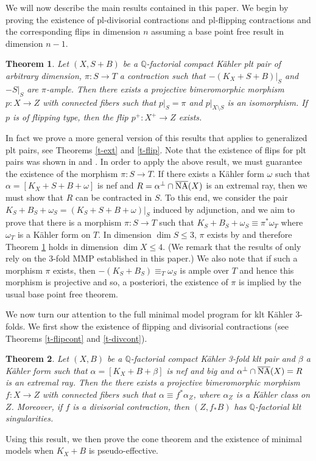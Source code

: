 \documentclass[12pt]{amsart}
\theoremstyle{plain}
\newtheorem{theorem}{Theorem}[section]
\theoremstyle{remark}
\theoremstyle{definition}
\newcommand{\<}{\leq}
\newcommand{\mbQ}{\mathbb{Q}}
\newcommand{\Q}{{\mathbb{Q}}}
\def\dim{\operatorname{dim}}
\theoremstyle{definition}
\theoremstyle{definition}
\numberwithin{equation}{section}
\theoremstyle{remark}
\begin{document}
We will now describe the main results contained in this paper. We begin by proving the existence of pl-divisorial contractions and pl-flipping contractions and the corresponding flips in dimension $n$ assuming a base point free result in dimension $n-1$.
\begin{theorem}\label{t-pl}
    Let $(X,S+B)$ be a $\Q$-factorial compact K\"ahler plt pair of arbitrary dimension, $\pi :S\to T$ a contraction such that $-(K_X+S+B)|_S$ and $-S|_S$ are $\pi$-ample. Then there exists a projective bimeromorphic morphism $p : X \to Z$ with connected fibers such that $p|_S = \pi$
and $p|_{X\setminus S}$ is an isomorphism. If $p$ is of flipping type, then the flip $p^+:X^+\to Z$ exists.
\end{theorem}
In fact we prove a more general version of this results that applies to generalized plt pairs, see Theorems \ref{t-ext} and \ref{t-flip}.
Note that the existence of flips for plt pairs was shown in \cite{Fuj22} and \cite{DHP22}.
In order to apply the above result, we must guarantee the existence of the morphism $\pi :S\to T$. If there exists a K\"ahler form $\omega$ such that $\alpha =[K_X+S+B+\omega]$ is nef and $R=\alpha ^\perp\cap \overline{\rm NA}(X)$ is an extremal ray, then we must show that $R$ can be contracted in $S$.
To this end, we consider the pair $K_S+B_S+\omega _S=(K_S+S+B+\omega)|_S$ induced by adjunction, and we aim to prove that there is a morphism $\pi:S\to T$ such that $K_S+B_S+\omega _S\equiv \pi ^* \omega _T$ where $\omega _T$ is a K\"ahler form on $T$. 
In dimension $\dim S \leq 3$, $\pi$ exists by \cite{DHY23} and therefore Theorem \ref{t-pl} holds in dimension $\dim X\leq 4$. (We remark that the results of \cite{DHY23} only rely on the 3-fold MMP established in this paper.)
We also note that if such a morphism $\pi$ exists, then $-(K_S+B_S)\equiv _T \omega_S$ is ample over $T$ and hence this morphism is projective and so, a posteriori, the existence of $\pi$ is implied by the usual base point free theorem.

We now turn our attention to the full minimal model program for klt K\"ahler 3-folds. We first show the existence of flipping and divisorial contractions (see Theorems \ref{t-flipcont} and \ref{t-divcont}).
\begin{theorem}\label{thm:contractions}
    Let $(X,B)$ be a $\mbQ$-factorial compact K\"ahler 3-fold klt pair and $\beta$ a K\"ahler form such that $\alpha=[K_X+B+\beta]$ is nef and big and $\alpha ^\perp \cap \overline {\rm NA}(X)=R$ is an extremal ray. Then the there exists a projective bimeromorphic morphism $f:X\to Z$ with connected fibers such that 
    $\alpha \equiv f^*\alpha _Z$, where $\alpha _Z$ is a K\"ahler class on $Z$. Moreover, if $f$ is a divisorial contraction, then $(Z, f_*B)$ has $\mbQ$-factorial klt singularities. 
\end{theorem}
Using this result, we then prove the cone theorem and the existence of minimal models when $K_X+B$ is pseudo-effective. 
\end{document}
